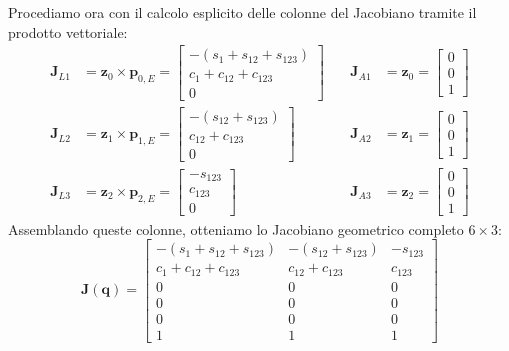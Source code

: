 ﻿\documentclass[11pt, a4paper]{article}
\begin{document}
Procediamo ora con il calcolo esplicito delle colonne del Jacobiano tramite il prodotto vettoriale:
\[
\begin{alignedat}{2}
    \bm{J}_{L1} &= \bm{z}_0 \times \bm{p}_{0,E} = \begin{bmatrix} -(s_1+s_{12}+s_{123}) \\ c_1+c_{12}+c_{123} \\ 0 \end{bmatrix} &\quad \bm{J}_{A1} &= \bm{z}_0 = \begin{bmatrix} 0 \\ 0 \\ 1 \end{bmatrix} \\
    \bm{J}_{L2} &= \bm{z}_1 \times \bm{p}_{1,E} = \begin{bmatrix} -(s_{12}+s_{123}) \\ c_{12}+c_{123} \\ 0 \end{bmatrix} &\quad \bm{J}_{A2} &= \bm{z}_1 = \begin{bmatrix} 0 \\ 0 \\ 1 \end{bmatrix} \\
    \bm{J}_{L3} &= \bm{z}_2 \times \bm{p}_{2,E} = \begin{bmatrix} -s_{123} \\ c_{123} \\ 0 \end{bmatrix} &\quad \bm{J}_{A3} &= \bm{z}_2 = \begin{bmatrix} 0 \\ 0 \\ 1 \end{bmatrix}
\end{alignedat}
\]
Assemblando queste colonne, otteniamo lo Jacobiano geometrico completo $6 \times 3$:
\[
    \bm{J}(\bm{q}) =
    \begin{bmatrix}
        -(s_{1} + s_{12} + s_{123}) & -(s_{12} + s_{123}) & -s_{123} \\
        c_{1} + c_{12} + c_{123} & c_{12} + c_{123} & c_{123} \\
        0 & 0 & 0 \\
        \hline
        0 & 0 & 0 \\
        0 & 0 & 0 \\
        1 & 1 & 1
    \end{bmatrix}
\]
\end{document}
